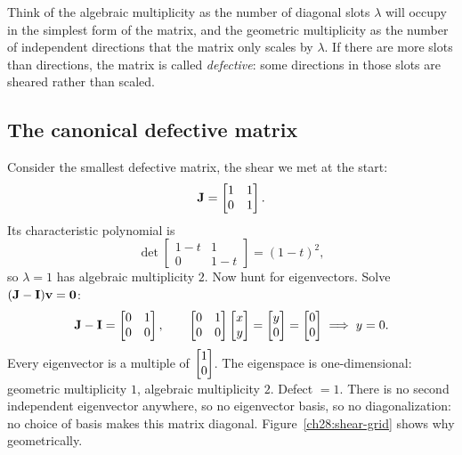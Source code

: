 \begin{intuitionbox}
Think of the algebraic multiplicity as the number of diagonal slots $\lambda$ will
occupy in the simplest form of the matrix, and the geometric multiplicity as the number
of independent directions that the matrix only scales by $\lambda$. If there are more
slots than directions, the matrix is called \emph{defective}: some directions in those
slots are sheared rather than scaled.
\end{intuitionbox}

\subsection{The canonical defective matrix}

Consider the smallest defective matrix, the shear we met at the start:
\[
\mathbf{J} = \begin{bmatrix} 1 & 1 \\ 0 & 1 \end{bmatrix}.
\]
Its characteristic polynomial is
\[
\det\begin{bmatrix}1-t&1\\0&1-t\end{bmatrix}=(1-t)^2,
\]
so $\lambda=1$ has algebraic multiplicity $2$. Now hunt for eigenvectors. Solve
$(\mathbf{J}-\mathbf{I})\mathbf{v}=\mathbf{0}$:
\[
\mathbf{J}-\mathbf{I}=\begin{bmatrix}0&1\\0&0\end{bmatrix},\qquad
\begin{bmatrix}0&1\\0&0\end{bmatrix}\begin{bmatrix}x\\y\end{bmatrix}=\begin{bmatrix}y\\0\end{bmatrix}=\begin{bmatrix}0\\0\end{bmatrix}
\;\Longrightarrow\; y=0.
\]
Every eigenvector is a multiple of $\begin{bmatrix}1\\0\end{bmatrix}$. The eigenspace is one-dimensional:
geometric multiplicity $1$, algebraic multiplicity $2$. Defect $=1$. There is no second
independent eigenvector anywhere, so no eigenvector basis, so no diagonalization: no
choice of basis makes this matrix diagonal. Figure~\ref{ch28:shear-grid} shows why
geometrically.


